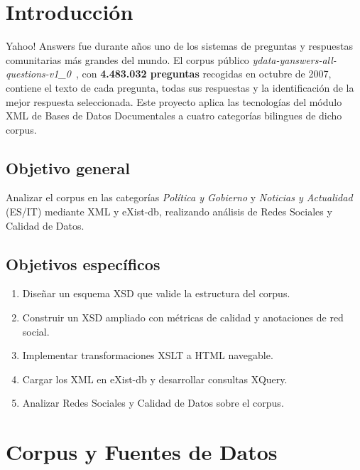 \documentclass[10pt,twocolumn,a4paper]{article}
\begin{document}
\section{Introducci\'on}

Yahoo! Answers fue durante a\~nos uno de los sistemas de preguntas y
respuestas comunitarias m\'as grandes del mundo. El corpus p\'ublico
\textit{ydata-yanswers-all-questions-v1\_0}~\cite{yahoowebscope}, con
\textbf{4.483.032 preguntas} recogidas en octubre de 2007, contiene el
texto de cada pregunta, todas sus respuestas y la identificaci\'on de
la mejor respuesta seleccionada. Este proyecto aplica las tecnolog\'ias
del m\'odulo XML de Bases de Datos Documentales a cuatro categor\'ias
bilingues de dicho corpus.

\subsection{Objetivo general}

Analizar el corpus en las categor\'ias \textit{Pol\'itica y Gobierno}
y \textit{Noticias y Actualidad} (ES/IT) mediante XML y eXist-db,
realizando an\'alisis de Redes Sociales y Calidad de Datos.

\subsection{Objetivos espec\'ificos}

\begin{enumerate}[leftmargin=1.8em,itemsep=0pt,topsep=2pt]
    \item Dise\~nar un esquema XSD que valide la estructura del corpus.
    \item Construir un XSD ampliado con m\'etricas de calidad y
          anotaciones de red social.
    \item Implementar transformaciones XSLT a HTML navegable.
    \item Cargar los XML en eXist-db y desarrollar consultas XQuery.
    \item Analizar Redes Sociales y Calidad de Datos sobre el corpus.
\end{enumerate}

\section{Corpus y Fuentes de Datos}
\end{document}
